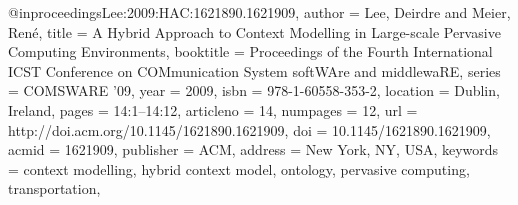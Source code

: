 @inproceedings{Lee:2009:HAC:1621890.1621909,
 author = {Lee, Deirdre and Meier, Ren{\'e}},
 title = {A Hybrid Approach to Context Modelling in Large-scale Pervasive Computing Environments},
 booktitle = {Proceedings of the Fourth International ICST Conference on COMmunication System softWAre and middlewaRE},
 series = {COMSWARE '09},
 year = {2009},
 isbn = {978-1-60558-353-2},
 location = {Dublin, Ireland},
 pages = {14:1--14:12},
 articleno = {14},
 numpages = {12},
 url = {http://doi.acm.org/10.1145/1621890.1621909},
 doi = {10.1145/1621890.1621909},
 acmid = {1621909},
 publisher = {ACM},
 address = {New York, NY, USA},
 keywords = {context modelling, hybrid context model, ontology, pervasive computing, transportation},
}
